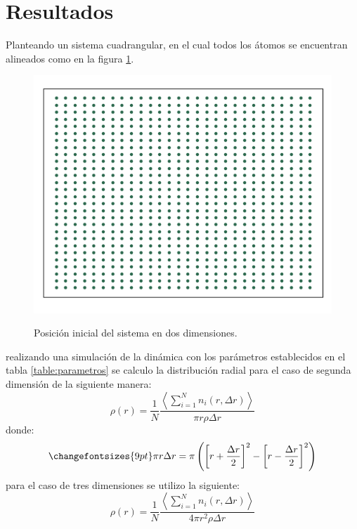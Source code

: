 \documentclass[reprint,amsmath,amssymb,aps,]{revtex4-2}
\begin{document}
\section{Resultados}
Planteando un sistema cuadrangular, en el cual todos los átomos se encuentran alineados como en la figura \ref{pos inicial}.
\begin{figure}[H]
    \centering
    \includegraphics[scale=0.3]{../Graphics/Cor_in.png}\\
    \caption{Posición inicial del sistema en dos dimensiones.}
    \label{pos inicial}
\end{figure}
realizando una simulación de la dinámica con los parámetros establecidos en el tabla \ref{table:parametros} se calculo la distribución radial para el caso de segunda dimensión de la siguiente manera:
\begin{equation}
    \rho(r) = \frac{1}{N} \frac{\left\langle \sum\limits_{i=1}^N n_i(r,\Delta r)  \right\rangle}{\pi r \rho \Delta r}
    \label{eq:rhor}
\end{equation}
donde:
\begin{equation}
    \changefontsizes{9pt}
    \label{eq:area}
    \pi r \Delta r = \pi \left(\left[r +\frac{\Delta r}{2}\right]^2 - \left[r- \frac{\Delta r}{2} \right]^2 \right)
\end{equation}
para el caso de tres dimensiones se utilizo la siguiente:
\begin{equation}
    \rho(r) = \frac{1}{N} \frac{\left\langle \sum\limits_{i=1}^N n_i(r,\Delta r)  \right\rangle}{ 4\pi r^2 \rho \Delta r}
    \label{eq:rhor3}
\end{equation}
\end{document}
